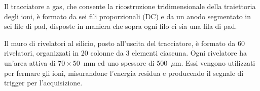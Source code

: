 Il tracciatore a gas, che consente la ricostruzione tridimensionale della traiettoria degli ioni, è formato da sei fili proporzionali (DC) e da un anodo segmentato in sei file di pad, disposte in maniera che sopra ogni filo ci sia una fila di pad.




Il muro di rivelatori al silicio, posto all'uscita del tracciatore, è formato da 60 rivelatori, organizzati in 20 colonne da 3 elementi ciascuna. 
Ogni rivelatore ha un'area attiva di $70 \times 50$~mm ed uno spessore di 500~$\mu$m.
Essi vengono utilizzati per fermare gli ioni, misurandone l'energia residua e producendo il segnale di trigger per l'acquisizione. 

